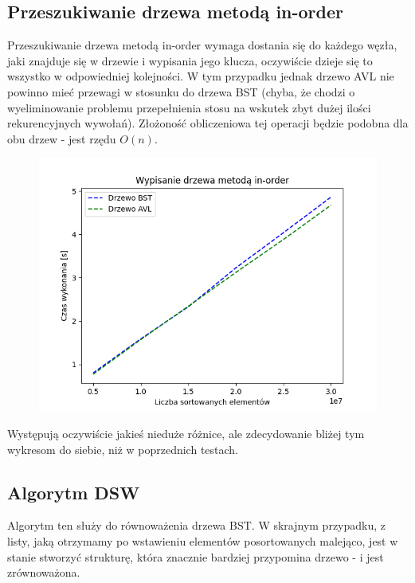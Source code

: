 \documentclass[12pt]{article}
\begin{document}
        \subsection{Przeszukiwanie drzewa metodą in-order}
        Przeszukiwanie drzewa metodą in-order wymaga dostania się do każdego węzła, jaki znajduje się w drzewie i wypisania jego klucza, oczywiście dzieje się to wszystko w odpowiedniej kolejności. W tym przypadku jednak drzewo AVL nie powinno mieć przewagi w stosunku do drzewa BST (chyba, że chodzi o wyeliminowanie problemu przepełnienia stosu na wskutek zbyt dużej ilości rekurencyjnych wywołań). Złożoność obliczeniowa tej operacji będzie podobna dla obu drzew - jest rzędu $O(n)$.
        
        \begin{figure}[h]
            \centering
            \includegraphics[width=\textwidth]{wykresy/Wypisanie_drzewa_metodą_in-order.png}
        \end{figure}
        
        Występują oczywiście jakieś nieduże różnice, ale zdecydowanie bliżej tym wykresom do siebie, niż w poprzednich testach.
        
        \newpage
        
        \subsection{Algorytm DSW}
        Algorytm ten służy do równoważenia drzewa BST. W skrajnym przypadku, z listy, jaką otrzymamy po wstawieniu elementów posortowanych malejąco, jest w stanie stworzyć strukturę, która znacznie bardziej przypomina drzewo - i jest zrównoważona.
        
\end{document}
